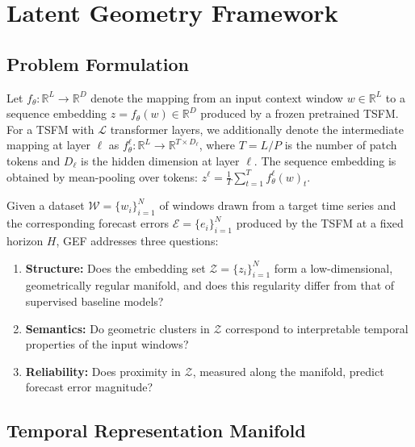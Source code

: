 
\section{Latent Geometry Framework}
\label{sec:framework}

\subsection{Problem Formulation}
\label{sec:formulation}

Let $f_\theta: \mathbb{R}^L \to \mathbb{R}^D$ denote the mapping from an input
context window $w \in \mathbb{R}^L$ to a sequence embedding
$z = f_\theta(w) \in \mathbb{R}^D$ produced by a frozen pretrained TSFM.
For a TSFM with $\mathcal{L}$ transformer layers, we additionally denote
the intermediate mapping at layer $\ell$ as
$f_\theta^\ell: \mathbb{R}^L \to \mathbb{R}^{T \times D_\ell}$,
where $T = L/P$ is the number of patch tokens and $D_\ell$ is the hidden
dimension at layer $\ell$.
The sequence embedding is obtained by mean-pooling over tokens:
$z^\ell = \frac{1}{T}\sum_{t=1}^T f_\theta^\ell(w)_t$.

Given a dataset $\mathcal{W} = \{w_i\}_{i=1}^N$ of windows drawn from a
target time series and the corresponding forecast errors
$\mathcal{E} = \{e_i\}_{i=1}^N$ produced by the TSFM at a fixed horizon $H$,
GEF addresses three questions:

\begin{enumerate}
  \item \textbf{Structure:} Does the embedding set
        $\mathcal{Z} = \{z_i\}_{i=1}^N$ form a low-dimensional, geometrically
        regular manifold, and does this regularity differ from that of supervised
        baseline models?
  \item \textbf{Semantics:} Do geometric clusters in $\mathcal{Z}$ correspond
        to interpretable temporal properties of the input windows?
  \item \textbf{Reliability:} Does proximity in $\mathcal{Z}$, measured along
        the manifold, predict forecast error magnitude?
\end{enumerate}

\subsection{Temporal Representation Manifold}
\label{sec:trm}

